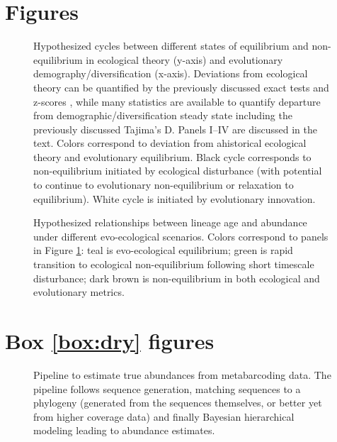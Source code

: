 \documentclass[12pt]{article}
\newcounter{Box}
\begin{document}
\pagebreak

\section*{Figures}

\begin{figure}[!hbp]
  \centering
  \caption{Hypothesized cycles between different states of equilibrium
    and non-equilibrium in ecological theory (y-axis) and evolutionary
    demography/diversification (x-axis). Deviations from ecological
    theory can be quantified by the previously discussed exact tests
    \citep{etienne2007} and z-scores \citep{meteR}, while many
    statistics are available to quantify departure from
    demographic/diversification steady state including the previously
    discussed Tajima's D. Panels I--IV are discussed in the text.
    Colors correspond to deviation from ahistorical ecological theory
    and evolutionary equilibrium.  Black cycle corresponds to
    non-equilibrium initiated by ecological disturbance (with
    potential to continue to evolutionary non-equilibrium or
    relaxation to equilibrium). White cycle is initiated by
    evolutionary innovation.}
  \label{fig:cycles}
\end{figure}

\begin{figure}[!hbp]
  \centering
  \caption{Hypothesized relationships between lineage age and
    abundance under different evo-ecological scenarios. Colors
    correspond to panels in Figure \ref{fig:cycles}: teal is
    evo-ecological equilibrium; green is rapid transition to
    ecological non-equilibrium following short timescale disturbance;
    dark brown is non-equilibrium in both ecological and evolutionary
    metrics.}
  \label{fig:age-abund}
\end{figure}

\pagebreak

\section*{Box \ref{box:dry} figures}

\setcounter{figure}{0}
\renewcommand{\thefigure}{\Roman{figure}}

\begin{figure}[!hbp]
  \centering
  \caption{Pipeline to estimate true abundances from metabarcoding
    data. The pipeline follows sequence generation, matching sequences
    to a phylogeny (generated from the sequences themselves, or better
    yet from higher coverage data) and finally Bayesian hierarchical
    modeling leading to abundance estimates.}
  \label{fig:abundPipeline}
\end{figure}
\end{document}
